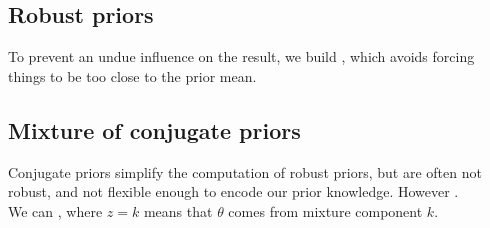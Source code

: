 \subsection{Robust priors}
To prevent an undue influence on the result, we build , which 
avoids forcing things to be too close to the prior mean.

\subsection{Mixture of conjugate priors}
Conjugate priors simplify the computation of robust priors, but are often not robust, and 
not flexible enough to encode our prior knowledge. However .\\
We can , where $z=k$ means 
that $\theta$ comes from mixture component $k$.

